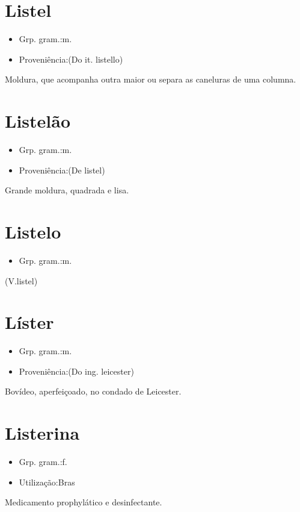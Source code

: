 \section{Listel}
\begin{itemize}
\item {Grp. gram.:m.}
\end{itemize}
\begin{itemize}
\item {Proveniência:(Do it. \textunderscore listello\textunderscore )}
\end{itemize}
Moldura, que acompanha outra maior ou separa as caneluras de uma columna.
\section{Listelão}
\begin{itemize}
\item {Grp. gram.:m.}
\end{itemize}
\begin{itemize}
\item {Proveniência:(De \textunderscore listel\textunderscore )}
\end{itemize}
Grande moldura, quadrada e lisa.
\section{Listelo}
\begin{itemize}
\item {Grp. gram.:m.}
\end{itemize}
(V.listel)
\section{Líster}
\begin{itemize}
\item {Grp. gram.:m.}
\end{itemize}
\begin{itemize}
\item {Proveniência:(Do ing. \textunderscore leicester\textunderscore )}
\end{itemize}
Bovídeo, aperfeiçoado, no condado de Leicester.
\section{Listerina}
\begin{itemize}
\item {Grp. gram.:f.}
\end{itemize}
\begin{itemize}
\item {Utilização:Bras}
\end{itemize}
Medicamento prophylático e desinfectante.
